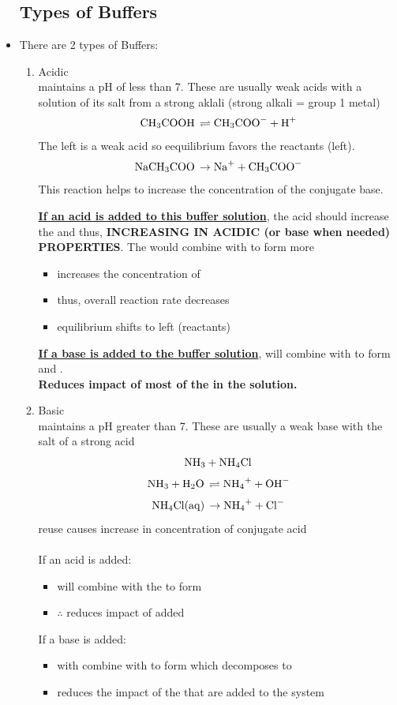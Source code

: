 \documentclass{article}
\begin{document}
\begin{itemize}
\subsection{Types of Buffers}
\item There are 2 types of Buffers:
\begin{enumerate}
\item Acidic\\maintains a pH of less than 7. These are usually weak acids with a solution of its salt from a strong aklali (strong alkali = group 1 metal) 
$$\ce{CH3COOH \rightleftharpoons CH3COO- + H+}$$
The left is a weak acid so eequilibrium favors the reactants (left).
$$\ce{NaCH3COO \rightarrow Na+ + CH3COO-}$$
This reaction helps to increase the concentration of the conjugate base.

\textbf{\underline{If an acid is added to this buffer solution}}, the acid should increase the \ce{[H+]} and thus, \textbf{INCREASING IN ACIDIC (or base when needed) PROPERTIES}. The  would combine with  to form more 
\begin{itemize}
\item increases the concentration of 
\item thus, overall reaction rate decreases
\item equilibrium shifts to left (reactants)
\end{itemize}

\textbf{\underline{If a base is added to the buffer solution}},  will combine with  to form  and .  \\\textbf{Reduces impact of most of the  in the solution.}

\item Basic\\maintains a pH greater than 7. These are usually a weak base with the salt of a strong acid
$$\ce{NH3 + NH4Cl}$$
$$\ce{NH3 + H2O \rightleftharpoons NH4+ + OH-}$$
$$\ce{NH4Cl(aq) \rightarrow NH4+ + Cl-}$$
reuse causes increase in concentration of conjugate acid\\\\
If an acid is added:
\begin{itemize}
\item {} will combine with the  to form 
\item $\therefore $ reduces impact of added 
\end{itemize}
If a base is added:
\begin{itemize}
\item {} with combine with  to form  which decomposes to 
\item reduces the impact of the  that are added to the system  
\end{itemize}
\end{enumerate}
\end{itemize}
\end{document}
